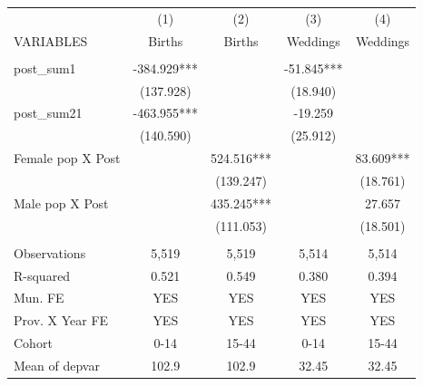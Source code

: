\begin{tabular}{lcccc} \hline
 & (1) & (2) & (3) & (4) \\
VARIABLES & Births & Births & Weddings & Weddings \\ \hline
 &  &  &  &  \\
post\_sum1 & -384.929*** &  & -51.845*** &  \\
 & (137.928) &  & (18.940) &  \\
post\_sum21 & -463.955*** &  & -19.259 &  \\
 & (140.590) &  & (25.912) &  \\
Female pop X Post &  & 524.516*** &  & 83.609*** \\
 &  & (139.247) &  & (18.761) \\
Male pop X Post &  & 435.245*** &  & 27.657 \\
 &  & (111.053) &  & (18.501) \\
 &  &  &  &  \\
Observations & 5,519 & 5,519 & 5,514 & 5,514 \\
R-squared & 0.521 & 0.549 & 0.380 & 0.394 \\
Mun. FE & YES & YES & YES & YES \\
Prov. X Year FE & YES & YES & YES & YES \\
Cohort & 0-14 & 15-44 & 0-14 & 15-44 \\
 Mean of depvar & 102.9 & 102.9 & 32.45 & 32.45 \\ \hline
\end{tabular}
